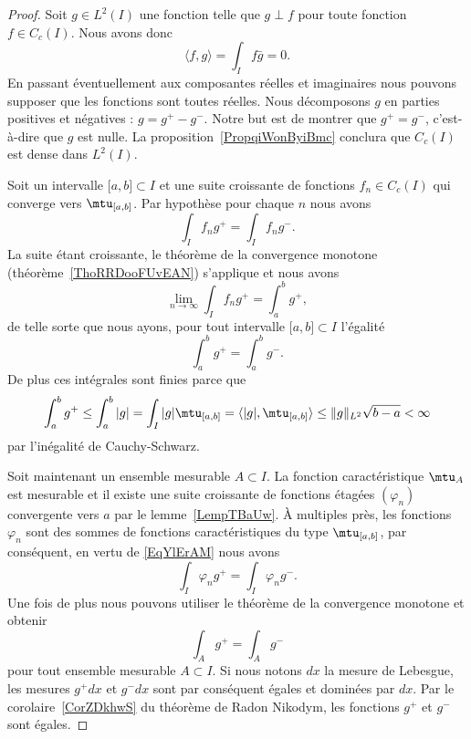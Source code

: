 \begin{proof}
    Soit \( g\in L^2(I)\) une fonction telle que \( g\perp f\) pour toute fonction \( f\in C_c(I)\). Nous avons donc
    \begin{equation}
        \langle f, g\rangle =\int_If\bar g=0.
    \end{equation}
    En passant éventuellement aux composantes réelles et imaginaires nous pouvons supposer que les fonctions sont toutes réelles. Nous décomposons \( g\) en parties positives et négatives : \( g=g^+-g^-\). Notre but est de montrer que \( g^+=g^-\), c'est-à-dire que \( g\) est nulle. La proposition~\ref{PropqiWonByiBmc} conclura que \( C_c(I)\) est dense dans \( L^2(I)\).

    Soit un intervalle \( \mathopen[ a , b \mathclose]\subset I\) et une suite croissante de fonctions \( f_n\in C_c(I)\) qui converge vers \( \mtu_{\mathopen[ a , b \mathclose]}\). Par hypothèse pour chaque \( n\) nous avons
    \begin{equation}
        \int_If_ng^+=\int_I f_ng^-.
    \end{equation}
    La suite étant croissante, le théorème de la convergence monotone (théorème~\ref{ThoRRDooFUvEAN}) s'applique et nous avons
    \begin{equation}
        \lim_{n\to \infty} \int_I f_ng^+=\int_a^bg^+,
    \end{equation}
    de telle sorte que nous ayons, pour tout intervalle \( \mathopen[ a , b \mathclose]\subset I\) l'égalité
    \begin{equation}        \label{EqYlErAM}
        \int_a^bg^+=\int_a^bg^-.
    \end{equation}
    De plus ces intégrales sont finies parce que
    \begin{equation}
        \int_a^b g^+\leq\int_a^b| g |=\int_I| g |\mtu_{\mathopen[ a , b \mathclose]}=\langle | g |, \mtu_{\mathopen[ a , b \mathclose]}\rangle \leq \| g \|_{L^2}\sqrt{b-a}<\infty
    \end{equation}
    par l'inégalité de Cauchy-Schwarz.

    Soit maintenant un ensemble mesurable \( A\subset I\). La fonction caractéristique \( \mtu_A\) est mesurable et il existe une suite croissante de fonctions étagées \( (\varphi_n)\) convergente vers \( a\) par le lemme~\ref{LempTBaUw}. À multiples près, les fonctions \( \varphi_n\) sont des sommes de fonctions caractéristiques du type \( \mtu_{\mathopen[ a , b \mathclose]}\), par conséquent, en vertu de \eqref{EqYlErAM} nous avons
    \begin{equation}
        \int_I\varphi_ng^+=\int_I\varphi_ng^-.
    \end{equation}
    Une fois de plus nous pouvons utiliser le théorème de la convergence monotone et obtenir
    \begin{equation}
        \int_Ag^+=\int_A g^-
    \end{equation}
    pour tout ensemble mesurable \( A\subset I\). Si nous notons \( dx\) la mesure de Lebesgue, les mesures \( g^+dx\) et \( g^-dx\) sont par conséquent égales et dominées par \( dx\). Par le corolaire~\ref{CorZDkhwS} du théorème de Radon Nikodym, les fonctions \( g^+\) et \( g^-\) sont égales.
\end{proof}

